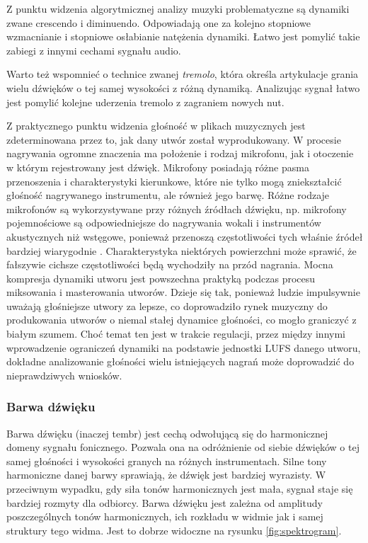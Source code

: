 \documentclass[12pt,a4paper,twoside]{mwart}
\begin{document}
Z punktu widzenia algorytmicznej analizy muzyki problematyczne są dynamiki zwane crescendo i diminuendo. Odpowiadają one za kolejno stopniowe wzmacnianie i stopniowe osłabianie natężenia dynamiki. Łatwo jest pomylić takie zabiegi z innymi cechami sygnału audio.

Warto też wspomnieć o technice zwanej \textit{tremolo}, która określa artykulacje  grania wielu dźwięków o tej samej wysokości z różną dynamiką. Analizując sygnał łatwo jest pomylić kolejne uderzenia tremolo z zagraniem nowych nut.

Z praktycznego punktu widzenia głośność w plikach muzycznych jest zdeterminowana przez to, jak dany utwór został wyprodukowany. W procesie nagrywania ogromne znaczenia ma położenie i rodzaj mikrofonu, jak i otoczenie w którym rejestrowany jest dźwięk. Mikrofony posiadają różne pasma przenoszenia i charakterystyki kierunkowe, które nie tylko mogą zniekształcić głośność nagrywanego instrumentu, ale również jego barwę. Różne rodzaje mikrofonów są wykorzystywane przy różnych źródłach dźwięku, np. mikrofony pojemnościowe są odpowiedniejsze do nagrywania wokali i instrumentów akustycznych niż wstęgowe, ponieważ przenoszą częstotliwości tych właśnie źródeł bardziej wiarygodnie \cite[48-52]{Homerecording:DlaKazdego}. Charakterystyka niektórych powierzchni może sprawić, że fałszywie cichsze częstotliwości będą wychodziły na przód nagrania. Mocna kompresja dynamiki utworu jest powszechna praktyką podczas procesu miksowania i masterowania utworów. Dzieje się tak, ponieważ ludzie impulsywnie uważają głośniejsze utwory za lepsze, co doprowadziło rynek muzyczny do produkowania utworów o niemal stałej dynamice głośności, co mogło graniczyć z białym szumem. Choć temat ten jest w trakcie regulacji, przez między innymi wprowadzenie ograniczeń dynamiki na podstawie jednostki LUFS danego utworu, dokładne analizowanie głośności wielu istniejących nagrań może doprowadzić do nieprawdziwych wniosków.

\subsubsection{Barwa dźwięku}
Barwa dźwięku (inaczej tembr) jest cechą odwołującą się do harmonicznej domeny sygnału fonicznego. Pozwala ona na odróżnienie od siebie dźwięków o tej samej głośności i wysokości granych na różnych instrumentach. Silne tony harmoniczne danej barwy sprawiają, że dźwięk jest bardziej wyrazisty. W przeciwnym wypadku, gdy siła tonów harmonicznych jest mała, sygnał staje się bardziej rozmyty dla odbiorcy. Barwa dźwięku jest zależna od amplitudy poszczególnych tonów harmonicznych, ich rozkładu w widmie jak i samej struktury tego widma. Jest to dobrze widoczne na rysunku \ref{fig:spektrogram}.
\end{document}
